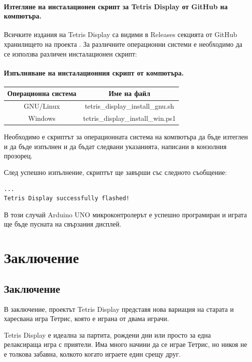 \documentclass[titlepage, oneside, 14pt]{extbook}
\renewcommand{\texttt}[1]{{\small\ttfamily #1}}
\newcommand{\ard}{Arduino\texttrademark{}}
\begin{document}
\subsubsection{Изтегляне на инсталационен скрипт за Tetris Display от GitHub на компютъра.}

Всичките издания на Tetris Display са видими в Releases секцията от GitHub хранилището на проекта \cite{github}.
За различните операционни системи е необходимо да се използва различен инсталационен скрипт:

\subsubsection{Изпълняване на инсталационния скрипт от компютъра.}

\begin{center}
  \begin{tabular}{c|c}
    Операционна система & Име на файл \\ 
    \hline
    GNU/Linux & \texttt{tetris_display_install_gnu.sh} \\  
    Windows & \texttt{tetris_display_install_win.ps1} \\  
  \end{tabular}
\end{center}

Необходимо е скриптът за операционната система на компютъра да бъде изтеглен и
да бъде изпълнен и да бъдат следвани указанията, написани в конзолния прозорец.

След успешно изпълнение, скриптът ще завърши със следното съобщение:

\begin{verbatim}
...
Tetris Display successfully flashed!
\end{verbatim}

В този случай \ard{} UNO микроконтролерът е успешно програмиран и играта ще бъде пусната на свързания дисплей.

\chapter{Заключение}

\tableofcontents


\section{Заключение}

В заключение, проектът Tetris Display представя нова вариация на старата и харесвана игра Тетрис,
която е играна от двама играчи.

\textmd{Tetris Display} е идеална за партита, рождени дни или просто за една релаксираща
игра с приятели. Има много начини да се играе \textmd{Тетрис}, но никоя не е толкова
забавна, колкото когато играете един срещу друг.

\printbibliography[heading=bibintoc]
\end{document}
